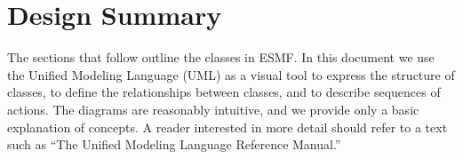 \section{Design Summary}

\begin{figure}
\label{fig:sandwich}
\end{figure}

The sections that follow outline the classes in ESMF.
In this document we use the Unified Modeling Language (UML) as a visual tool 
to express the structure of 
classes, to define the relationships between classes, and to describe sequences
of actions.  The diagrams are reasonably intuitive, and we provide 
only a basic explanation of concepts.  A reader interested in more detail should 
refer to a text such as ``The Unified Modeling Language Reference Manual.''










